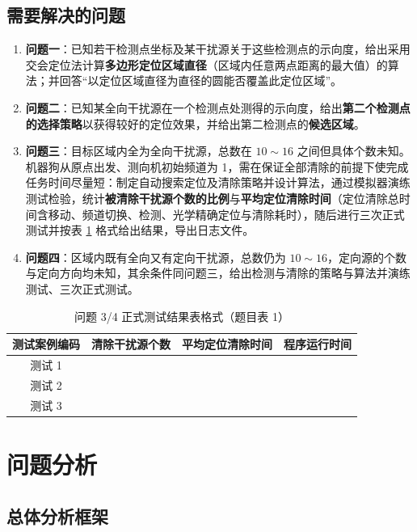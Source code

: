 \documentclass[withoutpreface,bwprint]{cumcmthesis}
\begin{document}
\subsection{需要解决的问题}

\begin{enumerate}
  \item \textbf{问题一}：已知若干检测点坐标及某干扰源关于这些检测点的示向度，给出采用交会定位法计算\textbf{多边形定位区域直径}（区域内任意两点距离的最大值）的算法；并回答“以定位区域直径为直径的圆能否覆盖此定位区域”。
  \item \textbf{问题二}：已知某全向干扰源在一个检测点处测得的示向度，给出\textbf{第二个检测点的选择策略}以获得较好的定位效果，并给出第二检测点的\textbf{候选区域}。
  \item \textbf{问题三}：目标区域内全为全向干扰源，总数在 $10\sim16$ 之间但具体个数未知。机器狗从原点出发、测向机初始频道为 1，需在保证全部清除的前提下使完成任务时间尽量短：制定自动搜索定位及清除策略并设计算法，通过模拟器演练测试检验，统计\textbf{被清除干扰源个数的比例}与\textbf{平均定位清除时间}（定位清除总时间含移动、频道切换、检测、光学精确定位与清除耗时），随后进行三次正式测试并按表 \ref{tab:formal} 格式给出结果，导出日志文件。
  \item \textbf{问题四}：区域内既有全向又有定向干扰源，总数仍为 $10\sim16$，定向源的个数与定向方向均未知，其余条件同问题三，给出检测与清除的策略与算法并演练测试、三次正式测试。
\end{enumerate}

\begin{table}[H]
\centering
\caption{问题 3/4 正式测试结果表格式（题目表 1）}\label{tab:formal}
\begin{tabular}{cccc}
\toprule
测试案例编码 & 清除干扰源个数 & 平均定位清除时间 & 程序运行时间\\
\midrule
测试 1 &&& \\
测试 2 &&& \\
测试 3 &&& \\
\bottomrule
\end{tabular}
\end{table}

\section{问题分析}

\subsection{总体分析框架}
\end{document}
